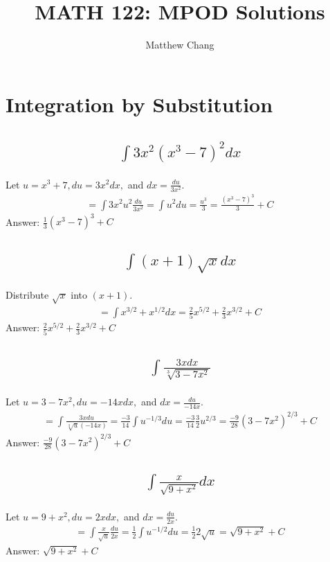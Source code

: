 \documentclass{article}
\title{MATH 122: MPOD Solutions}
\author{Matthew Chang}
\begin{document}
\maketitle
\tableofcontents
\newpage


\section{Integration by Substitution}
\subsection{
	\begin{align*}
		\int{3x^2 (x^3 - 7)^2 dx}
	\end{align*}
}
Let $u = x^3 + 7, du = 3x^2 dx,$ and $dx = \frac{du}{3x^2}$.
\begin{align*}
	= \int{3x^2 u^2 \frac{du}{3x^2}} = \int{u^2 du} = \frac{u^3}{3} = \frac{(x^3 - 7)^3}{3} + C
\end{align*}
Answer: $\frac{1}{3}(x^3 - 7)^3 + C$

\subsection{
	\begin{align*}
		\int{(x+1)\sqrt{x}dx}
	\end{align*}
}
Distribute $\sqrt{x}$ into $(x + 1)$. 
\begin{align*}
	= \int{x^{3/2} + x^{1/2} dx} = \frac{2}{5}x^{5/2} + \frac{2}{3}x^{3/2} + C
\end{align*}
Answer: $\frac{2}{5}x^{5/2} + \frac{2}{3}x^{3/2} + C$

\subsection{
	\begin{align*}
		\int{\frac{3x dx}{\sqrt[3]{3 - 7x^2}}}
	\end{align*}
}
Let $u = 3 - 7x^2, du = -14x dx,$ and $dx = \frac{du}{-14x}$.
\begin{align*}
	= \int{\frac{3xdu}{\sqrt[3]{u}(-14x)}} = \frac{-3}{14} \int{u^{-1/3}du} = \frac{-3}{14} \frac{3}{2} u^{2/3} = \frac{-9}{28} (3 - 7x^2)^{2/3} + C
\end{align*}
Answer: $\frac{-9}{28} (3 - 7x^2)^{2/3} + C$

\subsection{
	\begin{align*}
		\int{\frac{x}{\sqrt{9 + x^2}} dx}
	\end{align*}
}
Let $u = 9 + x^2, du = 2x dx,$ and $dx = \frac{du}{2x}$. 
\begin{align*}
	= \int{\frac{x}{\sqrt{u}} \frac{du}{2x}} = \frac{1}{2} \int{u^{-1/2} du} = \frac{1}{2} 2 \sqrt{u} = \sqrt{9+ x^2} + C
\end{align*}
Answer: $\sqrt{9+ x^2} + C$
\end{document}
